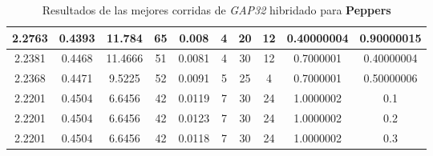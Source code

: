 \begin{table}[h!]
\begin{center}
\begin{tabular}{|c|c|c|c|c|c|c|c|c|c|}
        \hline
        \hline
            2.2763 & 0.4393  & 11.784 & 65 & 0.008 & 4 & 20 & 12 & 0.40000004 & 0.90000015\\
        \hline
        \hline
            2.2381 & 0.4468  & 11.4666 & 51 & 0.0081 & 4 & 30 & 12 & 0.7000001 & 0.40000004\\
        \hline
        \hline
            2.2368 & 0.4471  & 9.5225 & 52 & 0.0091 & 5 & 25 & 4 & 0.7000001 & 0.50000006\\
        \hline
        \hline
            2.2201 & 0.4504  & 6.6456 & 42 & 0.0119 & 7 & 30 & 24 & 1.0000002 & 0.1\\
        \hline
        \hline
            2.2201 & 0.4504  & 6.6456 & 42 & 0.0123 & 7 & 30 & 24 & 1.0000002 & 0.2\\
        \hline
        \hline
            2.2201 & 0.4504  & 6.6456 & 42 & 0.0118 & 7 & 30 & 24 & 1.0000002 & 0.3\\
        \hline
        \end{tabular}
        \caption{Resultados de las mejores corridas de \emph{GAP32} hibridado para {\bf Peppers}}
        \label{tb:tableGAP32}
    \end{center}
\end{table}

